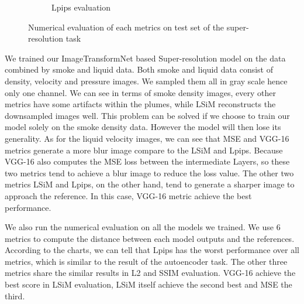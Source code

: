 \documentclass[a4paper,12pt,twoside]{report}
\begin{document}
\begin{figure}
\begin{subfigure}{0.32\textwidth}
		\caption{Lpips evaluation}
	\end{subfigure}
	\caption{Numerical evaluation of each metrics on test set of the super-resolution task}
\end{figure}
We trained our ImageTransformNet based Super-resolution model on the data combined by smoke and liquid data. Both smoke and liquid data consist of density, velocity and pressure images. We sampled them all in gray scale hence only one channel.
We can see in terms of smoke density images, every other metrics have some artifacts within the plumes, while LSiM reconstructs the downsampled images well. This problem can be solved if we choose to train our model solely on the smoke density data. However the model will then lose its generality.
As for the liquid velocity images, we can see that MSE and VGG-16 metrics generate a more blur image compare to the LSiM and Lpips. Because VGG-16 also computes the MSE loss between the intermediate Layers, so these two metrics tend to achieve a blur image to reduce the loss value. The other two metrics LSiM and Lpips, on the other hand, tend to generate a sharper image to approach the reference. In this case, VGG-16 metric achieve the best performance.

We also run the numerical evaluation on all the models we trained. We use 6 metrics to compute the distance between each model outputs and the references. According to the charts, we can tell that Lpips has the worst performance over all metrics, which is similar to the result of the autoencoder task. The other three metrics share the similar results in L2 and SSIM evaluation. VGG-16 achieve the best score in LSiM evaluation, LSiM itself achieve the second best and MSE the third.
\end{document}
